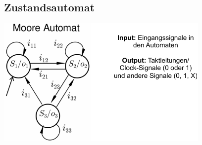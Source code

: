 \documentclass[ngerman, threecolumn, 8pt]{latex4ei/latex4ei_sheet}
\begin{document}
\subsection{Zustandsautomat}
\begin{center}
\includegraphics[width=.8\linewidth]{img/moore-automat.pdf}
\end{center}
\end{document}
